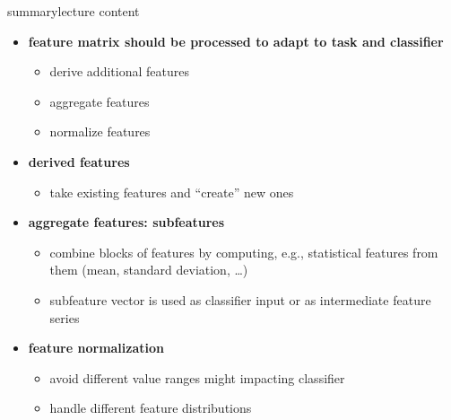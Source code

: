         \begin{frame}{summary}{lecture content}
            \begin{itemize}
                \item   \textbf{feature matrix should be processed to adapt to task and classifier}
                    \begin{itemize}
                        \item   derive additional features
                        \item   aggregate features
                        \item   normalize features
                    \end{itemize}
                \bigskip
                \item   \textbf{derived features}
                    \begin{itemize}
                        \item   take existing features and ``create'' new ones
                    \end{itemize}
                \bigskip
                \item   \textbf{aggregate features: subfeatures}
                    \begin{itemize}
                        \item   combine blocks of features by computing, e.g., statistical features from them (mean, standard deviation, \ldots)
                        \item   subfeature vector is used as classifier input or as intermediate feature series
                    \end{itemize}
                \bigskip
                \item   \textbf{feature normalization}
                    \begin{itemize}
                        \item   avoid different value ranges might impacting classifier
                        \item   handle different feature distributions
                    \end{itemize}
            \end{itemize}
        \end{frame}

